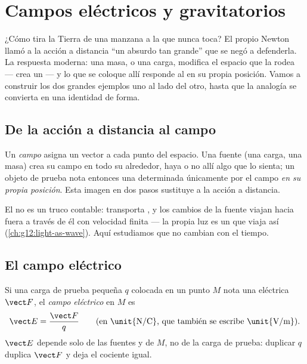 \chapter{Campos eléctricos y gravitatorios}\label{ch:g11:electric-gravitational-fields}

¿Cómo tira la Tierra de una manzana a la que nunca toca? El propio
Newton llamó a la acción a distancia ``un absurdo tan grande'' que se
negó a defenderla. La respuesta moderna: una masa, o una carga, modifica
el espacio que la rodea --- crea un \emph{} --- y lo que se
coloque allí responde al  en su propia posición. Vamos a construir
los dos grandes ejemplos uno al lado del otro, hasta que la analogía se
convierta en una identidad de forma.

\section{De la acción a distancia al campo}

\begin{definition}[Campo]\label{def:g11:electric-gravitational-fields:field}
Un \emph{campo} asigna un vector a cada punto del espacio.
Una fuente (una carga, una masa) crea su campo en todo su alrededor,
haya o no allí algo que lo sienta; un objeto de prueba nota entonces una
 determinada únicamente por el campo \emph{en su propia posición}.
Esta imagen en dos pasos sustituye a la acción a distancia.
\end{definition}

\begin{remark}
El  no es un truco contable: transporta , y los cambios de
la fuente viajan hacia fuera a través de él con velocidad finita --- la
propia luz es un  que viaja así
(\cref{ch:g12:light-as-wave}). Aquí estudiamos  que no cambian con
el tiempo.
\end{remark}

\section{El campo eléctrico}

\begin{definition}\label{def:g11:electric-gravitational-fields:efield}
Si una carga de prueba pequeña $q$ colocada en un punto $M$ nota una
 eléctrica $\vect F$, el \emph{campo
eléctrico} en $M$ es
\[
\vect E = \frac{\vect F}{q}
\qquad \text{(en \unit{N/C}, que también se escribe \unit{V/m})}.
\]
$\vect E$ depende solo de las fuentes y de $M$, no de la carga de
prueba: duplicar $q$ duplica $\vect F$ y deja el cociente igual.
\end{definition}

